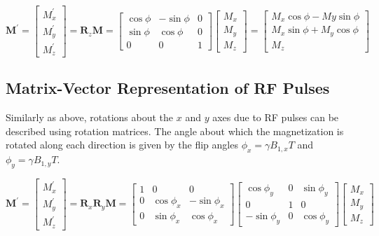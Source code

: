 \documentclass[11pt]{article}
\theoremstyle{definition}
\begin{document}
\begin{equation}
    \mathbf{M}^\prime = 
    \begin{bmatrix}
        M_x^\prime \\
        M_y^\prime \\
        M_z^\prime
    \end{bmatrix} = 
    \mathbf{R}_z \mathbf{M} = 
    \begin{bmatrix}
        \cos \phi & -\sin \phi & 0 \\
        \sin \phi & \cos \phi & 0 \\
        0 & 0 & 1
    \end{bmatrix}
    \begin{bmatrix}
        M_x\\
        M_y\\
        M_z
    \end{bmatrix} = 
    \begin{bmatrix}
        M_x \cos \phi - My \sin \phi \\
        M_x \sin \phi + M_y \cos \phi \\
        M_z
    \end{bmatrix}
\end{equation}

\subsection{Matrix-Vector Representation of RF Pulses}

Similarly as above, rotations about the $x$ and $y$ axes due to RF pulses can be described using rotation matrices. The angle about which the magnetization is rotated along each direction is given by the flip angles $\phi_x = \gamma B_{1,x} T$ and $\phi_y = \gamma B_{1,y} T$.

\begin{equation}
    \mathbf{M}^\prime = 
    \begin{bmatrix}
        M_x^\prime \\
        M_y^\prime \\
        M_z^\prime
    \end{bmatrix} = 
    \mathbf{R}_x \mathbf{R}_y \mathbf{M} = 
    \begin{bmatrix}
        1 & 0 & 0 \\
        0 & \cos \phi_x & -\sin \phi_x \\
        0 & \sin \phi_x & \cos \phi_x
    \end{bmatrix}
    \begin{bmatrix}
        \cos \phi_y & 0 & \sin \phi_y \\
        0 & 1 & 0 \\
        -\sin \phi_y & 0 & \cos \phi_y
    \end{bmatrix}
    \begin{bmatrix}
        M_x\\
        M_y\\
        M_z
    \end{bmatrix}
\end{equation}
\end{document}
